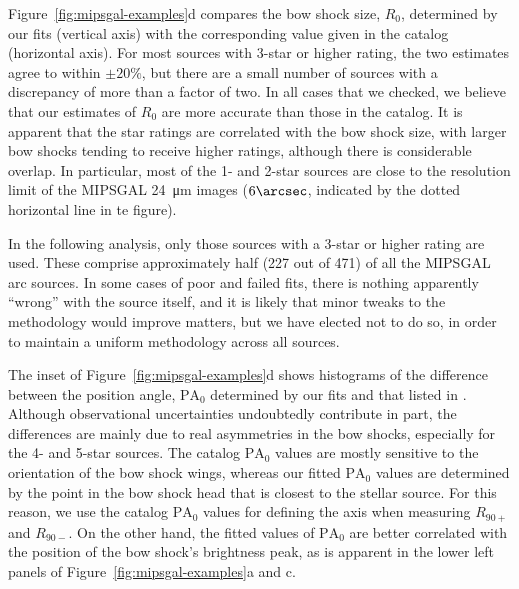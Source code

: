\bigskip
%
Figure~\ref{fig:mipsgal-examples}d compares the bow shock size,
\(R_0\), determined by our fits (vertical axis) with the corresponding
value given in the \citet{Kobulnicky:2016a} catalog (horizontal axis).
For most sources with 3-star or higher rating, the two estimates agree
to within \(\pm 20\%\), but there are a small number of sources with a
discrepancy of more than a factor of two.  In all cases that we
checked, we believe that our estimates of \(R_0\) are more accurate
than those in the catalog.  It is apparent that the star ratings are
correlated with the bow shock size, with larger bow shocks tending to
receive higher ratings, although there is considerable overlap.  In
particular, most of the 1- and 2-star sources are close to the
resolution limit of the MIPSGAL \SI{24}{\um} images (\(6\arcsec\),
indicated by the dotted horizontal line in te figure).

In the following analysis, only those sources with a 3-star or higher
rating are used.  These comprise approximately half (227 out of 471)
of all the MIPSGAL arc sources.  In some cases of poor and failed
fits, there is nothing apparently ``wrong'' with the source itself,
and it is likely that minor tweaks to the methodology would improve
matters, but we have elected not to do so, in order to maintain a
uniform methodology across all sources.

The inset of Figure~\ref{fig:mipsgal-examples}d shows histograms of
the difference between the position angle, \(\text{PA}_0\) determined
by our fits and that listed in \citet{Kobulnicky:2016a}.  Although
observational uncertainties undoubtedly contribute in part, the
differences are mainly due to real asymmetries in the bow shocks,
especially for the 4- and 5-star sources.  The
\citeauthor{Kobulnicky:2016a} catalog \(\text{PA}_0\) values are
mostly sensitive to the orientation of the bow shock wings, whereas
our fitted \(\text{PA}_0\) values are determined by the point in the
bow shock head that is closest to the stellar source.  For this
reason, we use the catalog \(\text{PA}_0\) values for defining the
axis when measuring \(R_{90+}\) and \(R_{90-}\). On the other hand,
the fitted values of \(\text{PA}_0\) are better correlated with the
position of the bow shock's brightness peak, as is apparent in the
lower left panels of Figure~\ref{fig:mipsgal-examples}a and c.



